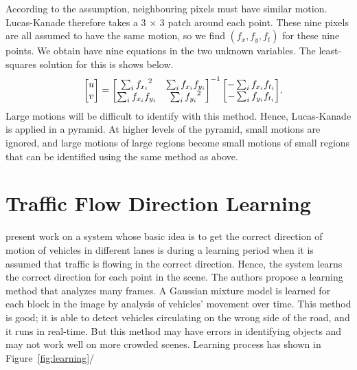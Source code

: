 According to the assumption, neighbouring pixels must have similar motion. Lucas-Kanade therefore takes a 3 $ \times $ 3 patch around each point. These nine pixels are all assumed to have the same motion, so we find  $ (f_x,f_y,f_t) $ for these nine points. We obtain have nine equations in the two unknown variables. The least-squares solution for this is shows below.
\[
\begin{array}{lc}
  {\rm } & {  \begin{bmatrix} u \\ v \end{bmatrix} = \begin{bmatrix} \sum_{i}{f_{x_i}}^2 & \sum_{i}{f_{x_i} f_{y_i} } \\ \sum_{i}{f_{x_i} f_{y_i}} & \sum_{i}{f_{y_i}}^2 \end{bmatrix}^{-1} \begin{bmatrix} - \sum_{i}{f_{x_i} f_{t_i}} \\ - \sum_{i}{f_{y_i} f_{t_i}} \end{bmatrix}  }.\\ 
\end{array}
\]
Large motions will be difficult to identify with this method. Hence, Lucas-Kanade is applied in a pyramid. At higher levels of the pyramid, small motions are ignored, and large motions of large regions become small motions of small regions that can be identified using the same method as above.

\section{Traffic Flow Direction Learning}
 present work on a system whose basic idea is to get the correct direction of motion of vehicles in different lanes is during a learning period when it is assumed that traffic is flowing in the correct direction. Hence, the system learns the correct direction for each point in the scene. The authors propose a learning method that analyzes many frames. A Gaussian mixture model is learned for each block in the image by analysis of vehicles' movement over time. This method is good; it is able to detect vehicles circulating on the wrong side of the road, and it runs in real-time. But this method may have errors in identifying objects and may not work well on more crowded scenes. Learning process has shown in Figure~\ref{fig:learning}/
 


